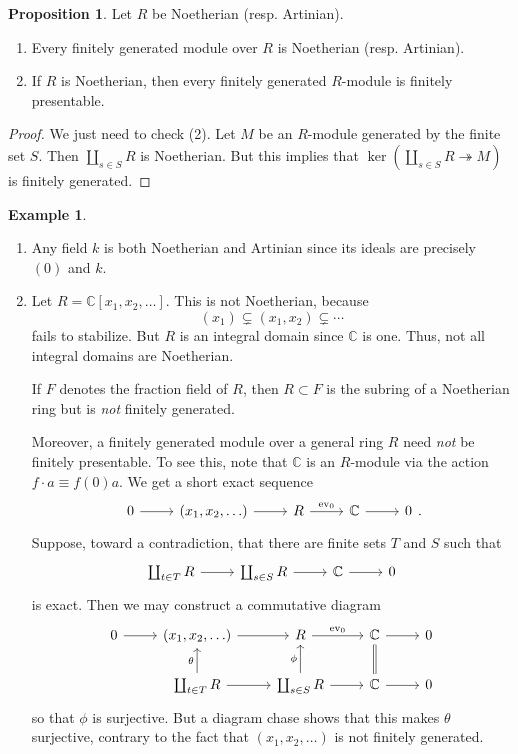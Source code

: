 \documentclass[10pt,letterpaper,cm]{nupset}
\theoremstyle{definition}
\newtheorem{exmp}[definition]{Example}
\theoremstyle{theorem}
\newtheorem{prop}[definition]{Proposition}
\theoremstyle{remark}
\newcommand{\C}{\mathbb C}
\newcommand{\1}{\mathbf{1}}
\newcommand{\0}{\vec 0}
\begin{document}
\begin{prop} Let $R$ be Noetherian (resp. Artinian).
\begin{enumerate}[label=(\arabic*)]
\item Every finitely generated module over $R$ is Noetherian (resp. Artinian).
\item If $R$ is Noetherian, then every finitely generated $R$-module is finitely presentable. 
\end{enumerate}
\end{prop}
\begin{proof}
We just need to check (2). Let $M$ be an $R$-module generated by the finite set $S$. Then  $\coprod_{s\in S} R$  is Noetherian. But this implies that $\ker(\coprod_{s\in S} R \twoheadrightarrow M)$ is finitely generated.
\end{proof}

\begin{exmp} $ $
\begin{enumerate}
\item Any field $k$ is both Noetherian and Artinian since its ideals are precisely $\left(0\right)$ and $k$.
\item Let $R= \C[x_1, x_2, \ldots]$. This is not Noetherian, because $$\left(x_1\right) \subsetneq \left(x_1, x_2\right) \subsetneq \cdots   $$ fails to stabilize. But $R$ is an integral domain since $\C$ is one. Thus, not all integral domains are Noetherian.

 If $F$ denotes the fraction field of $R$, then $R\subset F$ is the subring of a Noetherian ring but is \emph{not} finitely generated. 

Moreover, a finitely generated module over a general ring $R$ need \emph{not} be finitely presentable. To see this, note that $\C$ is an $R$-module via the action $f \cdot a \equiv f(0)a$. We get a short exact sequence
\[
\begin{tikzcd}
0 \arrow[r] & {(x_1, x_2, \ldots)} \arrow[r] & R \arrow[r, "\text{ev}_0"] & \C \arrow[r] & 0
\end{tikzcd}
.\]
Suppose, toward a contradiction, that there are finite sets $T$ and $S$ such that 
\[ 
\begin{tikzcd}
 \coprod_{t\in T}R \arrow[r] & \coprod_{s\in S} R \arrow[r] & \C \arrow[r]  & 0
\end{tikzcd} 
\]  is  exact. 
Then we may construct a commutative diagram
\[
\begin{tikzcd}
0 \arrow[r] & {(x_1, x_2, \ldots)} \arrow[r] & R \arrow[r, "\text{ev}_0"] & \C \arrow[r] & 0 \\
 & \coprod_{t\in T}R \arrow[r] \arrow[u, "\theta"] & \coprod_{s\in S} R \arrow[r] \arrow[u, "\phi"] & \C \arrow[r] \arrow[u, equal] & 0
\end{tikzcd}
\] so that $\phi$ is surjective. But a diagram chase shows that this makes $\theta$ surjective, contrary to the fact that $\left(x_1, x_2, \ldots\right)$ is not finitely generated.
\end{enumerate}
\end{exmp}
\end{document}
